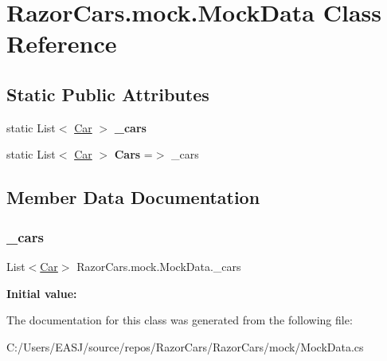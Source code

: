 \hypertarget{class_razor_cars_1_1mock_1_1_mock_data}{}\section{Razor\+Cars.\+mock.\+Mock\+Data Class Reference}
\label{class_razor_cars_1_1mock_1_1_mock_data}
\subsection*{Static Public Attributes}
\begin{DoxyCompactItemize}
\item 
static List$<$ \mbox{\hyperlink{class_razor_cars_1_1model_1_1_car}{Car}} $>$ {\bfseries \+\_\+cars}
\item 
\mbox{\label{class_razor_cars_1_1mock_1_1_mock_data_ac6e6a824af6c3aebebbc54bec0173615}} 
static List$<$ \mbox{\hyperlink{class_razor_cars_1_1model_1_1_car}{Car}} $>$ {\bfseries Cars} =$>$ \+\_\+cars
\end{DoxyCompactItemize}


\subsection{Member Data Documentation}
\mbox{\label{class_razor_cars_1_1mock_1_1_mock_data_adf22982a65fed1f35dfb5834bc081721}} 
\subsubsection{\texorpdfstring{\_cars}{\_cars}}
{\footnotesize\ttfamily List$<$\mbox{\hyperlink{class_razor_cars_1_1model_1_1_car}{Car}}$>$ Razor\+Cars.\+mock.\+Mock\+Data.\+\_\+cars\hspace{0.3cm}{\ttfamily [static]}}

{\bfseries Initial value\+:}
\begin{DoxyCode}{0}
\DoxyCodeLine{        \{}
\DoxyCodeLine{        \}}

\end{DoxyCode}


The documentation for this class was generated from the following file\+:\begin{DoxyCompactItemize}
\item 
C\+:/\+Users/\+E\+A\+S\+J/source/repos/\+Razor\+Cars/\+Razor\+Cars/mock/Mock\+Data.\+cs\end{DoxyCompactItemize}
